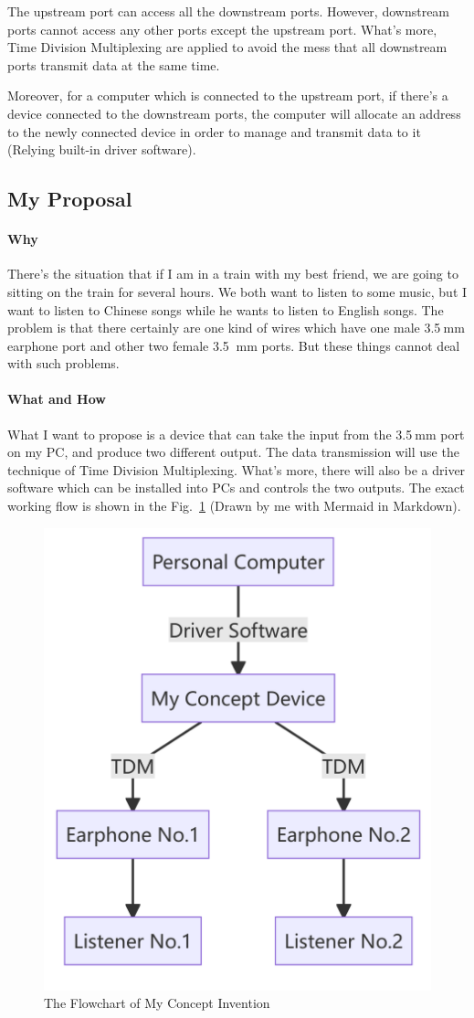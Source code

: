 \documentclass{article}
\begin{document}
The upstream port can access all the downstream ports. However, downstream ports cannot access any other ports except the upstream port. What's more, Time Division Multiplexing are applied to avoid the mess that all downstream ports transmit data at the same time.

Moreover, for a computer which is connected to the upstream port, if there's a device connected to the downstream ports, the computer will allocate an address to the newly connected device in order to manage and transmit data to it (Relying built-in driver software).

\subsection{My Proposal}

\paragraph{Why} There's the situation that if I am in a train with my best friend, we are going to sitting on the train for several hours. We both want to listen to some music, but I want to listen to Chinese songs while he wants to listen to English songs. The problem is that there certainly are one kind of wires which have one male 3.5$~\mathrm{mm}$ earphone port and other two female 3.5 $~\mathrm{mm}$ ports. But these things cannot deal with such problems.

\paragraph{What and How} What I want to propose is a device that can take the input from the 3.5$~\mathrm{mm}$ port on my PC, and produce two different output. The data transmission will use the technique of Time Division Multiplexing. What's more, there will also be a driver software which can be installed into PCs and controls the two outputs. The exact working flow is shown in the Fig.~\ref{fig:flowchartOfMyInvention} (Drawn by me with Mermaid in Markdown).

\begin{figure}[!h]
	\centering
	\includegraphics[width=2.6 in]{../pic/flowchartOfMyInvention.png}
	\caption{The Flowchart of My Concept Invention}
	\label{fig:flowchartOfMyInvention}
\end{figure}
\end{document}
